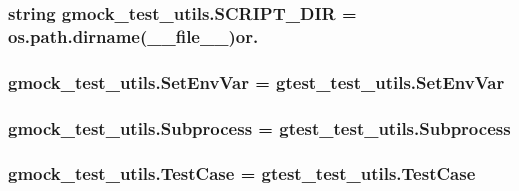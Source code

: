 \subsubsection[{\texorpdfstring{S\+C\+R\+I\+P\+T\+\_\+\+D\+IR}{SCRIPT_DIR}}]{\setlength{\rightskip}{0pt plus 5cm}string gmock\+\_\+test\+\_\+utils.\+S\+C\+R\+I\+P\+T\+\_\+\+D\+IR = os.\+path.\+dirname(\+\_\+\+\_\+file\+\_\+\+\_\+)or\textquotesingle{}.\textquotesingle{}}\hypertarget{namespacegmock__test__utils_a4ef94affd9d889f78d67be80017eeddd}{}\label{namespacegmock__test__utils_a4ef94affd9d889f78d67be80017eeddd}
\subsubsection[{\texorpdfstring{Set\+Env\+Var}{SetEnvVar}}]{\setlength{\rightskip}{0pt plus 5cm}gmock\+\_\+test\+\_\+utils.\+Set\+Env\+Var = gtest\+\_\+test\+\_\+utils.\+Set\+Env\+Var}\hypertarget{namespacegmock__test__utils_ab0c69f8ce649fdd5a17f99deedf3eb29}{}\label{namespacegmock__test__utils_ab0c69f8ce649fdd5a17f99deedf3eb29}
\subsubsection[{\texorpdfstring{Subprocess}{Subprocess}}]{\setlength{\rightskip}{0pt plus 5cm}gmock\+\_\+test\+\_\+utils.\+Subprocess = {\bf gtest\+\_\+test\+\_\+utils.\+Subprocess}}\hypertarget{namespacegmock__test__utils_a31a0e33565ec805d314cb0a4eb8317e6}{}\label{namespacegmock__test__utils_a31a0e33565ec805d314cb0a4eb8317e6}
\subsubsection[{\texorpdfstring{Test\+Case}{TestCase}}]{\setlength{\rightskip}{0pt plus 5cm}gmock\+\_\+test\+\_\+utils.\+Test\+Case = gtest\+\_\+test\+\_\+utils.\+Test\+Case}\hypertarget{namespacegmock__test__utils_a959c5af591e4d49b6d35745205b64509}{}\label{namespacegmock__test__utils_a959c5af591e4d49b6d35745205b64509}
